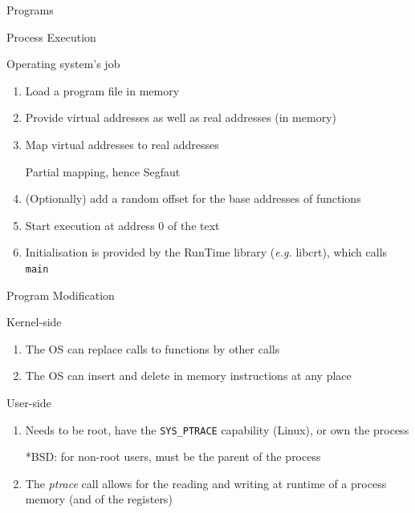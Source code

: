 \begin{reveals}
\begin{frame}[c,fragile]{Programs}
\end{frame}

\begin{frame}[c,fragile]{Process Execution}
  
  \begin{block}{Operating system's job}
    \begin{enumerate}[<-+>]
    \item Load a program file in memory
    \item Provide virtual addresses as well as real addresses (in memory)
    \item Map virtual addresses to real addresses
      \begin{center}
        \color{red}Partial mapping, hence Segfaut
      \end{center}
    \item (Optionally) add a random offset for the base addresses of functions
    \item Start execution at address 0 of the text
    \item Initialisation is provided by the RunTime library
      (\textit{e.g.} libcrt), which calls \texttt{main}
    \end{enumerate}
  \end{block}
  
\end{frame}

\begin{frame}[c,fragile]{Program Modification}
  
  \begin{block}{Kernel-side}
    \begin{enumerate}[<-+>]
    \item The OS can replace calls to functions by other calls
    \item The OS can insert and delete in memory instructions at any place
    \end{enumerate}
  \end{block}
  \vfill
  \begin{block}{User-side}
    \begin{enumerate}[<-+>]
    \item Needs to be root, have the \texttt{SYS\_PTRACE} capability
      (Linux), or own the process
      \begin{center}
        *BSD: for non-root users, must be the parent of the process
      \end{center}
    \item The \emph{ptrace} call allows for the reading and writing at
      runtime of a process memory (and of the registers)
    \end{enumerate}
  \end{block}
  

\end{frame}
\end{reveals}
